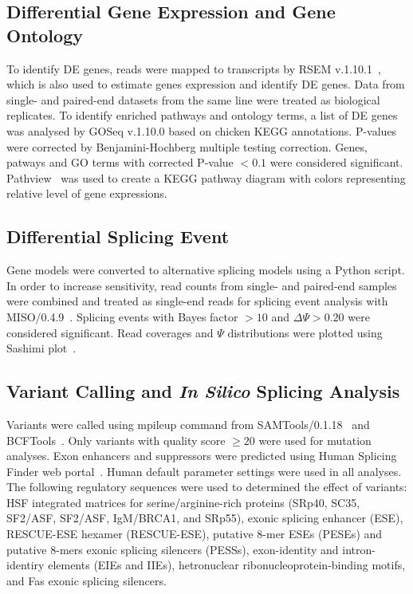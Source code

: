 \documentclass[10pt]{article}
\begin{document}
\subsection{Differential Gene Expression and Gene Ontology}

To identify DE genes, reads were mapped to transcripts by RSEM
v.1.10.1~\cite{li2011rsem}, which is also used to estimate genes expression and
identify DE genes.  Data from single- and paired-end datasets from the same line
were treated as biological replicates.  To identify enriched pathways and
ontology terms, a list of DE genes was analysed by GOSeq v.1.10.0 based on
chicken KEGG annotations.  P-values were corrected by Benjamini-Hochberg
multiple testing correction.  Genes, patways and GO terms with corrected P-value
$<0.1$ were considered significant.  Pathview~\cite{luo2013pathview} was used to
create a KEGG pathway diagram with colors representing relative level of gene
expressions.

\subsection{Differential Splicing Event}

Gene models were converted to alternative splicing models using a Python script.
In order to increase sensitivity, read counts from single- and paired-end
samples were combined and treated as single-end reads for splicing event
analysis with MISO/0.4.9~\cite{Katz:2010iv}.  Splicing events with Bayes factor
$>10$ and $\Delta\Psi>0.20$ were considered significant.  Read coverages and
$\Psi$ distributions were plotted using Sashimi plot~\cite{Katz:2013vx}.

\subsection{Variant Calling and {\em In Silico} Splicing Analysis} Variants were
called using mpileup command from SAMTools/0.1.18~\cite{} and BCFTools~\cite{}.
Only variants with quality score $\ge20$ were used for mutation analyses.  Exon
enhancers and suppressors were predicted using Human Splicing Finder web
portal~\cite{}.  Human default parameter settings were used in all analyses.
The following regulatory sequences were used to determined the effect of
variants: HSF integrated matrices for serine/arginine-rich proteins (SRp40,
SC35, SF2/ASF, SF2/ASF, IgM/BRCA1, and SRp55), exonic splicing enhancer (ESE),
RESCUE-ESE hexamer (RESCUE-ESE), putative 8-mer ESEs (PESEs) and putative 8-mers
exonic splicing silencers (PESSs), exon-identity and intron-identiry elements
(EIEs and IIEs), hetronuclear ribonucleoprotein-binding motifs, and Fas exonic
splicing silencers.
\end{document}
